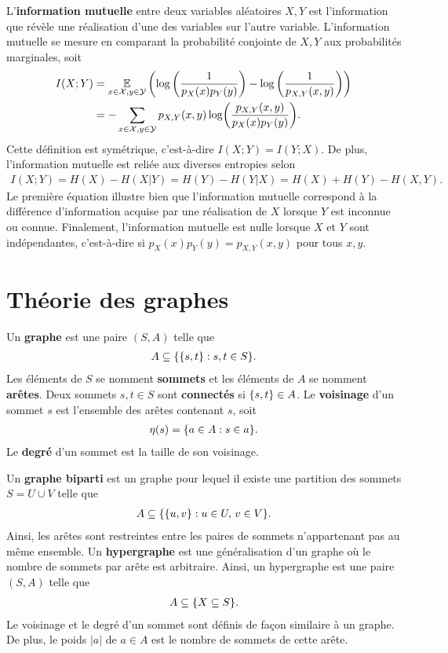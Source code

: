 L'\textbf{information mutuelle} entre deux variables aléatoires $X, Y$ est
l'information que révèle une réalisation d'une des variables sur l'autre variable.
L'information mutuelle se mesure en comparant la probabilité conjointe de $X, Y$
aux probabilités marginales, soit
\begin{align}
  I(X ; Y) 
  &= \operatorname*{\mathbb{E}}_{x\in\mathcal X, y\in\mathcal Y}\qty(
    \log\qty(\frac{1}{p_X(x)p_Y(y)})
    -
    \log\qty(\frac{1}{p_{X, Y}(x, y)})
  ) \notag \\
  &= -\sum_{x\in\mathcal X, y \in\mathcal Y}p_{X, Y}(x, y) \log(\frac{p_{X, Y}(x, y)}{p_X(x)p_Y(y)}).
\end{align}
Cette définition est symétrique,
c'est-à-dire $I(X ; Y) = I(Y ; X)$.
De plus,
l'information mutuelle est reliée aux diverses entropies selon
\begin{align}
  I(X;Y)
  = H(X) - H(X | Y)
  = H(Y) - H(Y | X)
  = H(X) + H(Y) - H(X, Y).
\end{align}
Le première équation illustre bien que l'information mutuelle correspond à la différence
d'information acquise par une réalisation de $X$ lorsque $Y$ est inconnue ou connue.
Finalement, l'information mutuelle est nulle lorsque $X$ et $Y$ sont indépendantes,
c'est-à-dire si $p_X(x)p_Y(y) = p_{X,Y}(x,y)$ pour tous $x, y$.


\chapter{Théorie des graphes}
\label{chap:theo_graphe}

Un \textbf{graphe} est une paire $(S, A)$ telle que 
\begin{align}
  A \subseteq \qty{\qty{s, t} : s,t \in S}.
\end{align}
Les éléments de $S$ se nomment \textbf{sommets}
et les éléments de $A$ se nomment \textbf{arêtes}.
Deux sommets $s, t \in S$ sont \textbf{connectés} si $\qty{s, t} \in A$.
Le \textbf{voisinage} d'un sommet $s$ est l'ensemble des arêtes contenant $s$,
soit 
\begin{align}
  \eta(s) = \qty{a \in A : s \in a}.
\end{align}
Le \textbf{degré} d'un sommet est la taille de son voisinage.

Un \textbf{graphe biparti} est un graphe pour lequel il existe une 
partition des sommets $S = U \cup V$ telle que 
\begin{align}
  A \subseteq \qty{\qty{u, v} : u \in U,\, v \in V}.
\end{align}
Ainsi, les arêtes sont restreintes entre les paires de sommets n'appartenant pas
au même ensemble.
Un \textbf{hypergraphe} est une généralisation d'un graphe
où le nombre de sommets par arête est arbitraire.
Ainsi,
un hypergraphe est une paire $(S, A)$ telle que
\begin{align}
  A \subseteq \qty{X \subseteq S}.
\end{align}
Le voisinage et le degré d'un sommet sont définis de façon similaire à un graphe.
De plus, le poids $|a|$ de $a \in A$ est le nombre de sommets de cette arête.

